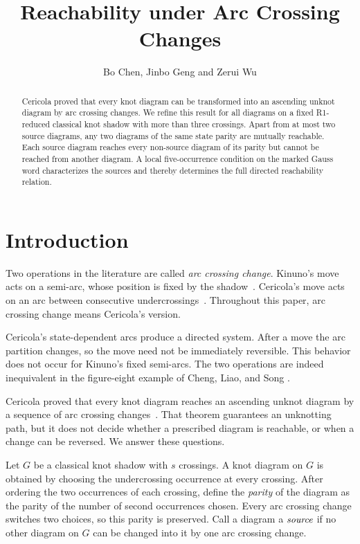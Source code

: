 \documentclass[11pt]{amsart}
\title[Reachability under arc crossing changes]
{Reachability under Arc Crossing Changes}
\author{Bo Chen, Jinbo Geng and Zerui Wu}
\theoremstyle{definition}
\theoremstyle{remark}
\begin{document}
\begin{abstract}
Cericola proved that every knot diagram can be transformed into an ascending
unknot diagram by arc crossing changes.  We refine this result for all
diagrams on a fixed R1-reduced classical knot shadow with more than three
crossings.  Apart from at most two
source  diagrams, any two diagrams of the same state parity
are mutually reachable.  Each source diagram reaches every
non-source diagram of its parity but cannot be reached from another
diagram.  A local five-occurrence condition on the marked Gauss word
characterizes the sources and thereby determines the full directed
reachability relation.
\end{abstract}

\maketitle

\section{Introduction}\label{sec:introduction}

Two operations in the literature are called \emph{arc crossing change}.
Kinuno's move acts on a semi-arc, whose position is fixed by the
shadow~\cite{Kinuno2022}.  Cericola's move acts on an arc between consecutive
undercrossings~\cite[Section~2.1]{Cericola2024}.   Throughout this
paper, arc crossing change means Cericola's version.

Cericola's state-dependent arcs produce a directed system. After a move the
arc partition changes, so the move need not be immediately reversible.  This
behavior does not occur for Kinuno's fixed semi-arcs.  The two operations are
indeed inequivalent in the figure-eight example of Cheng, Liao, and Song
\cite[Example~4.1]{ChengLiaoSong2025}.

Cericola proved that every knot diagram reaches an ascending unknot diagram
by a sequence of arc crossing changes~\cite[Theorem~3.1]{Cericola2024}.
That theorem guarantees an unknotting path, but it does not decide whether a
prescribed diagram is reachable, or when a change can be reversed.  We answer
these questions.

Let \(G\) be a classical knot shadow with \(s\) crossings.  A knot diagram on
\(G\) is obtained by choosing the undercrossing occurrence at every crossing.
After ordering the two occurrences of each crossing, define the \emph{parity} of the diagram as the parity of the number of second occurrences
chosen.  Every arc crossing change switches two choices, so this parity is
preserved.  Call a diagram a \(\emph{source}\) if no other diagram on \(G\)
can be changed into it by one arc crossing change.
\end{document}
